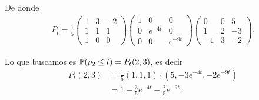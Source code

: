De donde
\begin{align}
    P_t  = \frac{1}{5}
            \begin{pmatrix}
                1   & 3  &   -2 \\
                1   & 1  &   1  \\
                1   & 0  &   0
            \end{pmatrix}
            \begin{pmatrix}
                1   & 0          &   0           \\
                0   & e^{-4t}    &   0           \\
                0   & 0          &   e^{-9t} 
            \end{pmatrix}        
            \begin{pmatrix}
                0   & 0  &   5   \\
                1   & 2  &   -3  \\
                -1  & 3  &   -2
            \end{pmatrix}.
\end{align}

Lo que buscamos es $\P(\rho_2 \leq t) = P_t(2, 3)$, es decir
\begin{align}
    P_t(2, 3)   &=  \frac{1}{5} (1,1,1)\cdot(5, -3e^{-4t}, -2e^{-9t})           \\
                &=  1 - \frac{3}{5}e^{-4t} - \frac{2}{5} e^{-9t}.
\end{align}
